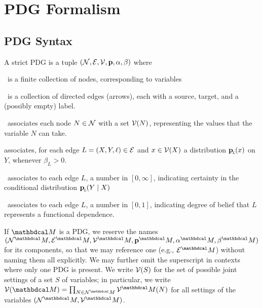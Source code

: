 \documentclass[the-pdg-manual.tex]{subfiles}
\begin{document}
	\section{PDG Formalism}
	\subsection{PDG Syntax}
	\def\pdgvars[#1]{(\N#1, \Ed#1, \V#1, \mat p#1, \alpha#1,\beta#1)}
	\begin{defn}[sPDG]\label{def:sPDG}
		A strict PDG is a tuple $\pdgvars[]$ where
		\begin{description}[nosep]
			\item[$\N$]~is a finite collection of nodes, 
				corresponding to variables
			\item[$\Ed$]~is a collection of directed edges (arrows), each with a source, target, and a (possibly empty) label.
			\item[$\V$]~associates each node $N \in \mathcal N$ with a set $\mathcal V(N)$,
			representing the values that the variable $N$ can take. 
			\item[$\mathbf p$] associates, for each edge $L = (X,Y, \ell) \in \mathcal E$ and $x \in \mathcal V(X)$ a distribution $\mathbf{p}_{\!_{L}\!}(x)$ on $Y$, whenever $\beta_L > 0$.
			\item[$\beta$]~associates to each edge $L$, a number in $[0,\infty]$, indicating certainty in the conditional distribution $\mathbf{p}_{\!_{L}\!}(Y \mid X)$ 
			\item[$\alpha$]~associates to each edge $L$, a number in $[0,1]$, indicating degree of belief that $L$ represents a functional dependence.
		\end{description}
		\vspace{-1.4em}
	\end{defn}

	If $\dg M$ is a PDG, we reserve the names $\pdgvars[^\dg M]$
	for its components, so that we may reference one (e.g.,
	$\Ed^\dg M$) without naming them all explicitly. We may further omit the superscript in contexts where only one PDG is present. 
	We write $\mathcal V(S)$ for the set of possible joint settings of a set $S$
	of variables; in particular, 
	we write $\V(\dg M)
	= \prod_{N \in \N^\dg M} \V^\dg M(N)$
	for all settings of the variables $(\N^\dg M, \V^\dg M)$.
	
\end{document}
